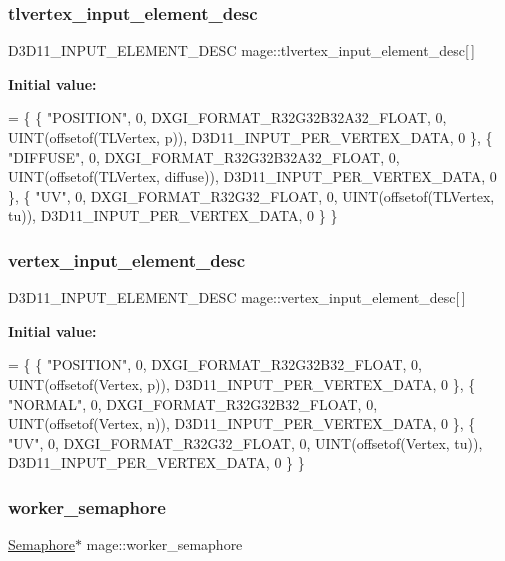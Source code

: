 \hypertarget{namespacemage_a53479d051c51213305d6ea7bcba7a5e8}{}\label{namespacemage_a53479d051c51213305d6ea7bcba7a5e8} 
\subsubsection{\texorpdfstring{tlvertex\+\_\+input\+\_\+element\+\_\+desc}{tlvertex\_input\_element\_desc}}
{\footnotesize\ttfamily D3\+D11\+\_\+\+I\+N\+P\+U\+T\+\_\+\+E\+L\+E\+M\+E\+N\+T\+\_\+\+D\+E\+SC mage\+::tlvertex\+\_\+input\+\_\+element\+\_\+desc\mbox{[}$\,$\mbox{]}}

{\bfseries Initial value\+:}
\begin{DoxyCode}
= \{
        \{ \textcolor{stringliteral}{"POSITION"}, 0, DXGI\_FORMAT\_R32G32B32A32\_FLOAT, 0, UINT(offsetof(TLVertex, p)), 
      D3D11\_INPUT\_PER\_VERTEX\_DATA, 0 \},
        \{ \textcolor{stringliteral}{"DIFFUSE"}, 0, DXGI\_FORMAT\_R32G32B32A32\_FLOAT, 0, UINT(offsetof(TLVertex, diffuse)), 
      D3D11\_INPUT\_PER\_VERTEX\_DATA, 0 \},
        \{ \textcolor{stringliteral}{"UV"}, 0, DXGI\_FORMAT\_R32G32\_FLOAT, 0, UINT(offsetof(TLVertex, tu)), D3D11\_INPUT\_PER\_VERTEX\_DATA, 
      0 \}
    \}
\end{DoxyCode}
\hypertarget{namespacemage_af852db837cfb700d168b6786abf62723}{}\label{namespacemage_af852db837cfb700d168b6786abf62723} 
\subsubsection{\texorpdfstring{vertex\+\_\+input\+\_\+element\+\_\+desc}{vertex\_input\_element\_desc}}
{\footnotesize\ttfamily D3\+D11\+\_\+\+I\+N\+P\+U\+T\+\_\+\+E\+L\+E\+M\+E\+N\+T\+\_\+\+D\+E\+SC mage\+::vertex\+\_\+input\+\_\+element\+\_\+desc\mbox{[}$\,$\mbox{]}}

{\bfseries Initial value\+:}
\begin{DoxyCode}
= \{
        \{ \textcolor{stringliteral}{"POSITION"}, 0, DXGI\_FORMAT\_R32G32B32\_FLOAT, 0, UINT(offsetof(Vertex, p)), 
      D3D11\_INPUT\_PER\_VERTEX\_DATA, 0 \},
        \{ \textcolor{stringliteral}{"NORMAL"}, 0, DXGI\_FORMAT\_R32G32B32\_FLOAT, 0, UINT(offsetof(Vertex, n)), 
      D3D11\_INPUT\_PER\_VERTEX\_DATA, 0 \},
        \{ \textcolor{stringliteral}{"UV"}, 0, DXGI\_FORMAT\_R32G32\_FLOAT, 0, UINT(offsetof(Vertex, tu)), D3D11\_INPUT\_PER\_VERTEX\_DATA, 0 
      \}
    \}
\end{DoxyCode}
\hypertarget{namespacemage_a17c3448f9fba7521d188d30bdfb77e33}{}\label{namespacemage_a17c3448f9fba7521d188d30bdfb77e33} 
\subsubsection{\texorpdfstring{worker\+\_\+semaphore}{worker\_semaphore}}
{\footnotesize\ttfamily \hyperlink{classmage_1_1_semaphore}{Semaphore}$\ast$ mage\+::worker\+\_\+semaphore\hspace{0.3cm}{\ttfamily [static]}}

